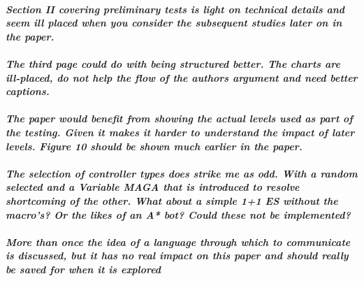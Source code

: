 \documentclass{article}
\begin{document}
\paragraph*{\textit{Section II covering preliminary tests is light on technical details and seem ill placed when you consider the subsequent studies later on in the paper.}}
\paragraph*{\textit{The third page could do with being structured better.  The charts are ill-placed, do not help the flow of the authors argument and need better captions.}}
\paragraph*{\textit{The paper would benefit from showing the actual levels used as part of the testing.  Given it makes it harder to understand the impact of later levels.  Figure 10 should be shown much earlier in the paper.}}
\paragraph*{\textit{The selection of controller types does strike me as odd.  With a random selected and a Variable MAGA that is introduced to resolve shortcoming of the other.  What about a simple 1+1 ES without the macro's?  Or the likes of an A* bot?  Could these not be implemented?}}
\paragraph*{\textit{More than once the idea of a language through which to communicate is discussed, but it has no real impact on this paper and should really be saved for when it is explored}}
\end{document}
